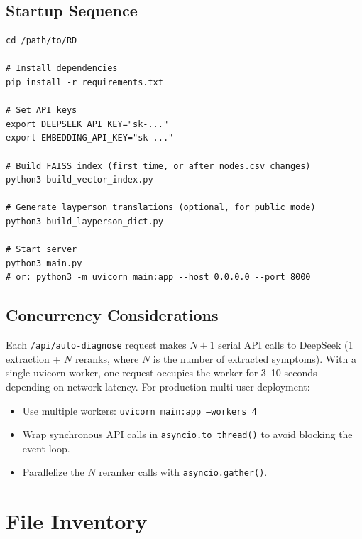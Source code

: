 \documentclass[11pt,a4paper]{article}
\begin{document}
\subsection{Startup Sequence}

\begin{lstlisting}[caption={Deployment commands}]
cd /path/to/RD

# Install dependencies
pip install -r requirements.txt

# Set API keys
export DEEPSEEK_API_KEY="sk-..."
export EMBEDDING_API_KEY="sk-..."

# Build FAISS index (first time, or after nodes.csv changes)
python3 build_vector_index.py

# Generate layperson translations (optional, for public mode)
python3 build_layperson_dict.py

# Start server
python3 main.py
# or: python3 -m uvicorn main:app --host 0.0.0.0 --port 8000
\end{lstlisting}

\subsection{Concurrency Considerations}

Each \texttt{/api/auto-diagnose} request makes $N+1$ serial API calls to DeepSeek (1 extraction + $N$ reranks, where $N$ is the number of extracted symptoms). With a single uvicorn worker, one request occupies the worker for 3–10 seconds depending on network latency. For production multi-user deployment:

\begin{itemize}[leftmargin=*]
  \item Use multiple workers: \texttt{uvicorn main:app --workers 4}
  \item Wrap synchronous API calls in \texttt{asyncio.to\_thread()} to avoid blocking the event loop.
  \item Parallelize the $N$ reranker calls with \texttt{asyncio.gather()}.
\end{itemize}

\newpage

\section{File Inventory}
\end{document}
